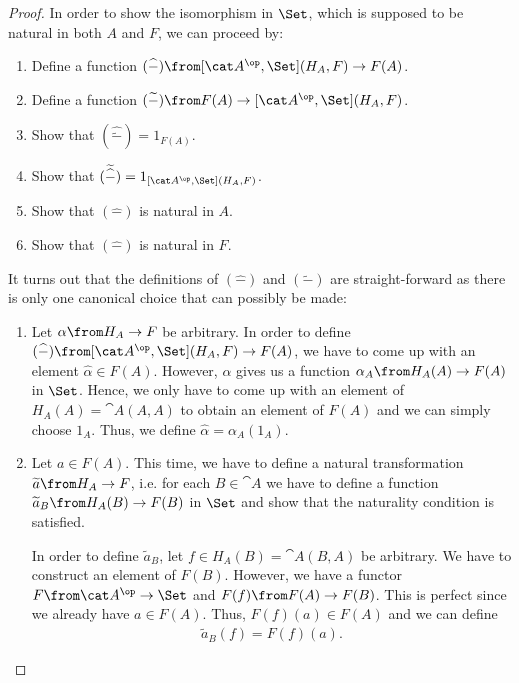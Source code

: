 \documentclass{article}
\begin{document}
\begin{proof}
  In order to show the isomorphism in $\Set$, which is supposed to be natural in both $A$ and $F$, we can proceed by:
  \begin{enumerate}
  \item Define a function $(\widehat{-})\from[\cat A^\op,\Set](H_A,F)\to F(A)$.
  \item Define a function $(\widetilde{-})\from F(A)\to[\cat A^\op,\Set](H_A,F)$.
  \item Show that $(\widehat{\widetilde{-}})=1_{F(A)}$.
  \item Show that $(\widetilde{\widehat{-}})=1_{[\cat A^\op,\Set](H_A,F)}$.
  \item Show that $(\widehat{-})$ is natural in $A$.
  \item Show that $(\widehat{-})$ is natural in $F$.
  \end{enumerate}
  It turns out that the definitions of $(\widehat{-})$ and $(\widetilde{-})$ are straight-forward as there is only one canonical choice that can possibly be made:
  \begin{enumerate}
  \item Let $\alpha\from H_A\to F$ be arbitrary. In order to define $(\widehat{-})\from[\cat A^\op,\Set](H_A,F)\to F(A)$, we have to come up with an element $\widehat\alpha\in F(A)$. However, $\alpha$ gives us a function $\alpha_A\from H_A(A)\to F(A)$ in $\Set$. Hence, we only have to come up with an element of $H_A(A)=\cat A(A,A)$ to obtain an element of $F(A)$ and we can simply choose $1_A$. Thus, we define $\widehat\alpha=\alpha_A(1_A)$.
  \item Let $a\in F(A)$. This time, we have to define a natural transformation $\widetilde a\from H_A\to F$, i.e. for each $B\in\cat A$ we have to define a function $\widetilde a_B\from H_A(B)\to F(B)$ in $\Set$ and show that the naturality condition is satisfied.

    In order to define $\tilde a_B$, let $f\in H_A(B)=\cat A(B,A)$ be arbitrary. We have to construct an element of $F(B)$. However, we have a functor $F\from\cat A^\op\to\Set$ and $F(f)\from F(A)\to F(B)$. This is perfect since we already have $a\in F(A)$. Thus, $F(f)(a)\in F(A)$ and we can define 
    \begin{align*}
      \widetilde a_B(f)=F(f)(a).
    \end{align*}


\end{enumerate}
\end{proof}
\end{document}
